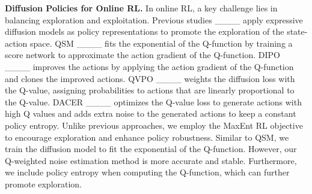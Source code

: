 \textbf{Diffusion Policies for Online RL.} In online RL, a key challenge lies in balancing exploration and exploitation. Previous studies ____ apply expressive diffusion models as policy representations to promote the exploration of the state-action space. QSM ____ fits the exponential of the Q-function by training a score network to approximate the action gradient of the Q-function. DIPO ____ improves the actions by applying the action gradient of the Q-function and clones the improved actions. QVPO ____ weights the diffusion loss with the Q-value, assigning probabilities to actions that are linearly proportional to the Q-value. DACER ____ optimizes the Q-value loss to generate actions with high Q values and adds extra noise to the generated actions to keep a constant policy entropy. Unlike previous approaches, we employ the MaxEnt RL objective to encourage exploration and enhance policy robustness. Similar to QSM, we train the diffusion model to fit the exponential of the Q-function. However, our Q-weighted noise estimation method is more accurate and stable. Furthermore, we include policy entropy when computing the Q-function, which can further promote exploration.